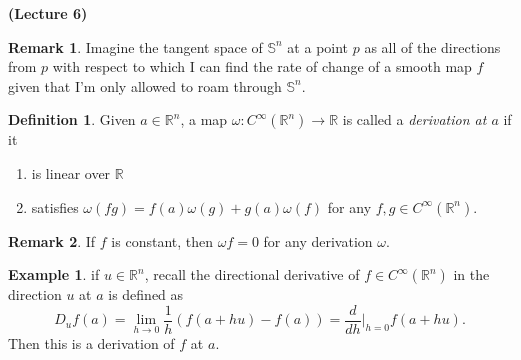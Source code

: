 \documentclass[10pt,letterpaper,cm]{nupset}
\theoremstyle{definition}
\newtheorem*{definition}{Definition}
\newtheorem{exmp}{Example}
\newtheorem{remark}{Remark}
\newcommand{\R}{\mathbb R}
\renewcommand{\S}{\mathbb S}
\newcommand{\1}{\mathbf{1}}
\newcommand{\0}{\vec 0}
\begin{document}
\begin{center}
{\textbf{(Lecture 6)}} 
\end{center}

\begin{remark}
Imagine the tangent space of $\S^n$ at a point $p$ as all of the directions from $p$ with respect to which I can find the rate of change of a smooth map $f$ given that I'm only allowed to roam through $\S^n$. 
\end{remark}


\begin{definition}
Given $a \in \R^n$, a map $\omega: C^{\infty}(\R^n) \to \R$ is called a \textit{derivation at $a$} if it
\begin{enumerate}[label=\alph*.]
\item is linear over $\R$
\item satisfies $\omega(fg) = f(a)\omega(g) + g(a) \omega(f)$ for any $f, g \in C^{\infty}(\R^n)$. 
\end{enumerate}
\end{definition}

\begin{remark}
If $f$ is constant, then $\omega f =0$ for any derivation $\omega$.
\end{remark}

\begin{exmp}
if $u \in \R^n$, recall the directional derivative of $f\in C^{\infty}(\R^n)$ in the direction $u$ at $a$ is defined as $$D_uf(a) = \lim_{h \to 0} \frac{1}{h}(f(a+hu) -f(a)) = \frac{d}{d{h}}\rvert_{h=0} f(a+hu).$$ Then this is a derivation of $f$ at $a$. 
\end{exmp}
\end{document}
